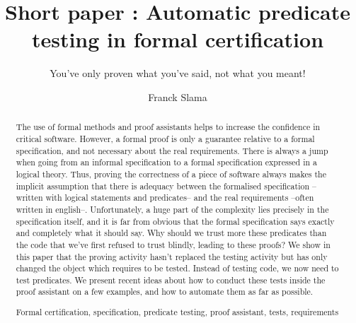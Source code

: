 \documentclass[runningheads,a4paper]{llncs}
\newcommand{\keywords}[1]{\par\addvspace\baselineskip
\noindent\keywordname\enspace\ignorespaces#1}
\begin{document}
\mainmatter  %

\title{Short paper : Automatic predicate testing in formal certification}
\subtitle{You've only proven what you've said, not what you meant!}



\author{Franck Slama\\
         }


\maketitle


\begin{abstract}
The use of formal methods and proof assistants helps to increase the confidence in critical software. However, a formal proof is only a guarantee relative to a formal specification, and not necessary about the real requirements. There is always a jump when going from an informal specification to a formal specification expressed in a logical theory. Thus, proving the correctness of a piece of software always makes the implicit assumption that there is adequacy between the formalised specification --written with logical statements and predicates-- and the real requirements --often written in english--. Unfortunately, a huge part of the complexity lies precisely in the specification itself, and it is far from obvious that the formal specification says exactly and completely what it should say. Why should we trust more these predicates than the code that we've first refused to trust blindly, leading to these proofs? We show in this paper that the proving activity hasn't replaced the testing activity but has only changed the object which requires to be tested. Instead of testing code, we now need to test predicates. We present recent ideas about how to conduct these tests inside the proof assistant on a few examples, and how to automate them as far as possible.

\keywords{Formal certification, specification, predicate testing, proof assistant, tests, requirements}
\end{abstract}




















\end{document}

